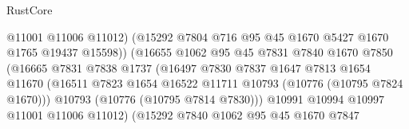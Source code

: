 \begin{lexlean}{RustCore}
\begin{coremodule}
                                        @11001
                                        @11006
                                        @11012)
                                      (@15292
                                        @7804
                                        @716
                                        @95
                                        @45
                                        @1670
                                        @5427
                                        @1670
                                        @1765
                                        @19437
                                        @15598))
                                    (@16655
                                      @1062
                                      @95
                                      @45
                                      @7831
                                      @7840
                                      @1670
                                      @7850
                                      (@16665
                                        @7831
                                        @7838
                                        @1737
                                        (@16497
                                          @7830
                                          @7837
                                          @1647
                                          @7813
                                          @1654
                                          @11670
                                          (@16511
                                            @7823
                                            @1654
                                            @16522
                                            @11711
                                            @10793
                                            (@10776 (@10795 @7824 @1670)))
                                          @10793
                                          (@10776 (@10795 @7814 @7830)))
                                        @10991
                                        @10994
                                        @10997
                                        @11001
                                        @11006
                                        @11012)
                                      (@15292
                                        @7840
                                        @1062
                                        @95
                                        @45
                                        @1670
                                        @7847

\end{coremodule}
\end{lexlean}
